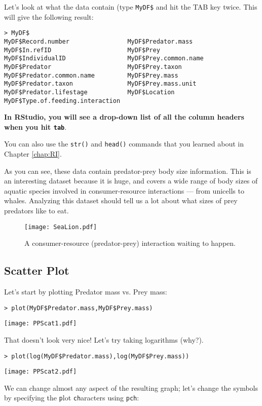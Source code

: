 Let's look at what the data contain (type {\tt MyDF\$} and hit the TAB 
key twice. This will give the following result: 
\begin{lstlisting}
> MyDF$
MyDF$Record.number                MyDF$Predator.mass
MyDF$In.refID                     MyDF$Prey
MyDF$IndividualID                 MyDF$Prey.common.name
MyDF$Predator                     MyDF$Prey.taxon
MyDF$Predator.common.name         MyDF$Prey.mass
MyDF$Predator.taxon               MyDF$Prey.mass.unit
MyDF$Predator.lifestage           MyDF$Location
MyDF$Type.of.feeding.interaction  
\end{lstlisting}
{\bf In RStudio, you will see a drop-down list of all the column 
headers when you hit {\tt tab}}.

You can also use the {\tt str()} and {\tt head()} commands that you 
learned about in Chapter \ref{chap:RI}.

As you can see, these data contain predator-prey body size information. 
This is an interesting dataset because it is huge, and covers a wide 
range of body sizes of aquatic species involved in consumer-resource 
interactions --- from unicells to whales. Analyzing this dataset should 
tell us a lot about what sizes of prey predators like to eat.

\begin{figure} \centering
   \texttt{[image: SeaLion.pdf]} 
	 \caption{A consumer-resource (predator-prey) interaction waiting to 
	 happen.}
\end{figure}

\subsection{Scatter Plot}

Let's start by plotting Predator mass vs. Prey mass:
\begin{lstlisting}
> plot(MyDF$Predator.mass,MyDF$Prey.mass)
\end{lstlisting}
\begin{center}
   \texttt{[image: PPScat1.pdf]} 
\end{center}

That doesn't look very nice! Let's try taking logarithms (why?). 

\begin{lstlisting}
> plot(log(MyDF$Predator.mass),log(MyDF$Prey.mass))
\end{lstlisting}
\begin{center}
   \texttt{[image: PPScat2.pdf]} 
\end{center}
We can change almost any aspect of the resulting graph; let's change the
symbols by specifying the {\tt p}lot {\tt ch}aracters using {\tt pch}:

